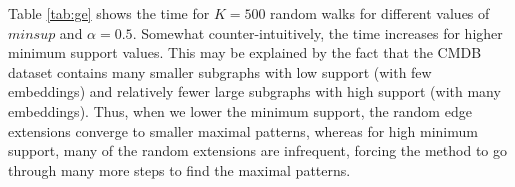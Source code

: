\smallskip{} Table \ref{tab:ge} shows the time
for $K=500$ random walks for different values of $minsup$ and $\alpha =
0.5$. Somewhat counter-intuitively, the time
increases for higher minimum support values.  This may be explained by
the fact that the CMDB dataset contains many smaller subgraphs with
low support (with few embeddings) and relatively fewer large subgraphs 
with high support (with many embeddings).
Thus, when we lower the minimum support, the random edge extensions
converge to smaller maximal patterns, whereas for high minimum support,
many of the random extensions are infrequent, forcing the method to go
through many more steps to find the maximal patterns. 

\begin{comment}
The running time results above include a particular optimization that we
applied for CMDB graphs, given the large multiplicities of the different
labels. For such graphs, the 
support computation procedure can be improved by computing the sets of
equivalent vertices, i.e., vertices that have the same neighborhood and
are indistinguishable. The representative set $R(u)$ of all equivalent
vertices are equal, and thus it has to be computed only once.  In
abstract algebra terms, such vertices belong to an orbit of the
automorphism group of the graph \cite{orbits}.  So, we can prune the
candidate representative sets of all the vertices in an orbit by
matching the labels of any vertex in the orbit with the labels of
vertices in the candidate set. Computing the orbits of an arbitrary
graph is a hard problem. Several heuristics have been proposed to
compute the orbits of a graph \cite{Everett}.  We use a simple heuristic
to find subsets of vertices, common ancestor leaves (CAL) that are
guaranteed to be in the same orbit. These are the subset of leaves that
have the same label and are connected to a common ancestor.  CAL is a
subset $S \subseteq \vg$, such that $\forall u \in S$ and the following
three properties hold true: i) $|N(u)|=1$, ii) $\exists v \in \vg$,
$(v,u) \in \eg$, and  iii) $L(u) = l$  for some $l \in \Sigma$.
An example of CAL is set of all vertices labeled ``9 $\times$ process'' in
figure \ref{fig:gepatsB}; here 9 is the multiplicity of that label. 
CAL sets have to be computed once for every
candidate and this step had negligible impact on the overall run time. 
\end{comment}

